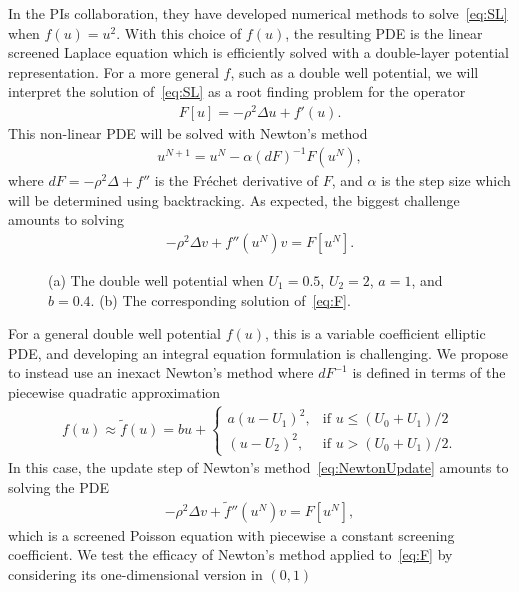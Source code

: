 In the PIs collaboration, they have developed numerical methods to
solve~\eqref{eq:SL} when $f(u) = u^2$. With this choice of $f(u)$, the
resulting PDE is the linear screened Laplace equation which is
efficiently solved with a double-layer potential representation. For a
more general $f$, such as a double well potential, we will interpret the
solution of~\eqref{eq:SL} as a root finding problem for the operator
\begin{align}
  \label{eq:F}
  F[u] = -\rho^2 \Delta u + f'(u).
\end{align}
This non-linear PDE will be solved with Newton's method
\begin{align*}
  u^{N+1} = u^{N} - \alpha (dF)^{-1} F(u^N),
\end{align*}
where $dF = -\rho^2 \Delta + f''$ is the Fr\'{e}chet derivative of $F$,
and $\alpha$ is the step size which will be determined using
backtracking. As expected, the biggest challenge amounts to solving
\begin{align}
  \label{eq:NewtonUpdate}
  - \rho^2 \Delta v + f''(u^{N}) v = F[u^N].
\end{align}
\begin{figure}
  \centering
  
  \caption{\label{fig:well} (a) The double well potential when $U_1 =
  0.5$, $U_2 = 2$, $a = 1$, and $b = 0.4$. (b) The corresponding
  solution of~\eqref{eq:F}.}
\end{figure}
For a general double well potential $f(u)$, this is a variable
coefficient elliptic PDE, and developing an integral equation
formulation is challenging. We propose to instead use an inexact
Newton's method where $dF^{-1}$ is defined in terms of the piecewise
quadratic approximation
\begin{align*}
  f(u) \approx \tilde{f}(u) = bu + \begin{cases}
    a(u - U_1)^2, &\mbox{if } u \leq (U_0 + U_1)/2 \\
    (u - U_2)^2, &\mbox{if } u > (U_0 + U_1)/2.
  \end{cases}
\end{align*}
In this case, the update step of Newton's method~\eqref{eq:NewtonUpdate}
amounts to solving the PDE
\begin{align}
  \label{eq:screenedPoisson}
  -\rho^2 \Delta v + \tilde{f}''(u^{N})v = F[u^N],
\end{align}
which is a screened Poisson equation with piecewise a constant screening
coefficient. We test the efficacy of Newton's method applied
to~\eqref{eq:F} by considering its one-dimensional version in $(0,1)$
